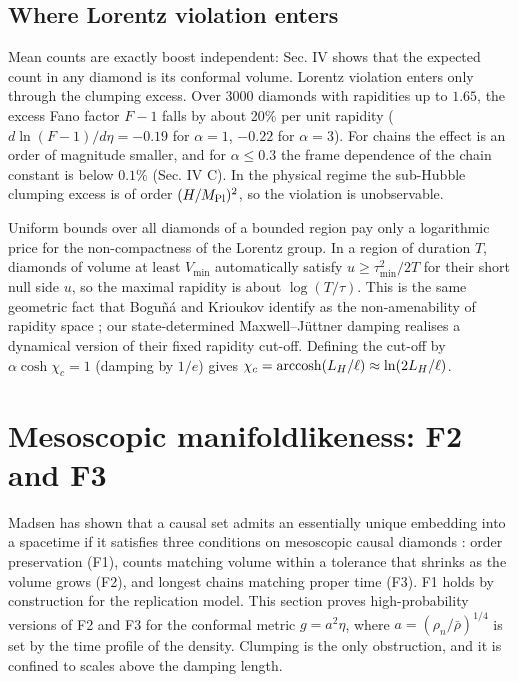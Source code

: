 \hypertarget{where-lorentz-violation-enters}{%
\subsection{Where Lorentz violation
enters}\label{where-lorentz-violation-enters}}

Mean counts are exactly boost independent: Sec. IV shows
that the expected count in any diamond is its conformal
volume. Lorentz violation enters only through the clumping
excess. Over 3000 diamonds with rapidities up to \(1.65\),
the excess Fano factor \(F-1\) falls by about 20\% per unit
rapidity (\(d\ln(F-1)/d\eta=-0.19\) for \(\alpha=1\),
\(-0.22\) for \(\alpha=3\)). For chains the effect is an
order of magnitude smaller, and for \(\alpha\le0.3\) the
frame dependence of the chain constant is below \(0.1\%\)
(Sec. IV C). In the physical regime the sub-Hubble clumping
excess is of order \((H/M_{\rm Pl})^2\), so the violation is
unobservable.

Uniform bounds over all diamonds of a bounded region pay
only a logarithmic price for the non-compactness of the
Lorentz group. In a region of duration \(T\), diamonds of
volume at least \(V_{\min}\) automatically satisfy
\(u\ge\tau_{\min}^2/2T\) for their short null side \(u\), so
the maximal rapidity is about \(\log(T/\tau)\). This is the
same geometric fact that Boguñá and Krioukov identify as the
non-amenability of rapidity space \cite{BK26}; our
state-determined Maxwell--Jüttner damping realises a
dynamical version of their fixed rapidity cut-off. Defining
the cut-off by \(\alpha\cosh\chi_c=1\) (damping by \(1/e\))
gives
\(\chi_c={\rm arccosh}(L_H/\ell)\approx\ln(2L_H/\ell)\).

\hypertarget{mesoscopic-manifoldlikeness-f2-and-f3}{%
\section{Mesoscopic manifoldlikeness: F2 and
F3}\label{mesoscopic-manifoldlikeness-f2-and-f3}}

Madsen has shown that a causal set admits an essentially
unique embedding into a spacetime if it satisfies three
conditions on mesoscopic causal diamonds \cite{Madsen26}:
order preservation (F1), counts matching volume within a
tolerance that shrinks as the volume grows (F2), and longest
chains matching proper time (F3). F1 holds by construction
for the replication model. This section proves
high-probability versions of F2 and F3 for the conformal
metric \(g=a^2\eta\), where \(a=(\rho_n/\bar\rho)^{1/4}\) is
set by the time profile of the density. Clumping is the only
obstruction, and it is confined to scales above the damping
length.

